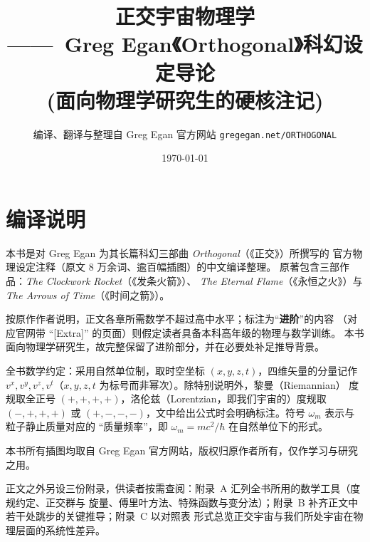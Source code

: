 



\frontmatter
\title{\Huge 正交宇宙物理学\\[6pt]
       \Large ——\ Greg Egan《Orthogonal》科幻设定导论\\(面向物理学研究生的硬核注记)}
\author{编译、翻译与整理自 Greg Egan 官方网站 \texttt{gregegan.net/ORTHOGONAL}}
\date{\today}
\maketitle

\chapter*{编译说明}
本书是对 Greg Egan 为其长篇科幻三部曲 \emph{Orthogonal}（《正交》）所撰写的
官方物理设定注释（原文 8 万余词、逾百幅插图）的中文编译整理。
原著包含三部作品：\emph{The Clockwork Rocket}（《发条火箭》）、
\emph{The Eternal Flame}（《永恒之火》）与 \emph{The Arrows of Time}（《时间之箭》）。

按原作作者说明，正文各章所需数学不超过高中水平；标注为“\textbf{进阶}”的内容
（对应官网带 ``[Extra]'' 的页面）则假定读者具备本科高年级的物理与数学训练。
本书面向物理学研究生，故完整保留了进阶部分，并在必要处补足推导背景。

全书数学约定：采用自然单位制，取时空坐标 $(x,y,z,t)$，四维矢量的分量记作
$v^x,v^y,v^z,v^t$（$x,y,z,t$ 为标号而非幂次）。除特别说明外，黎曼（Riemannian）
度规取全正号 $(+,+,+,+)$，洛伦兹（Lorentzian，即我们宇宙的）度规取 $(-,+,+,+)$
或 $(+,-,-,-)$，文中给出公式时会明确标注。符号 $\omega_m$ 表示与粒子静止质量对应的
“质量频率”，即 $\omega_m = mc^2/\hbar$ 在自然单位下的形式。

本书所有插图均取自 Greg Egan 官方网站，版权归原作者所有，仅作学习与研究之用。

正文之外另设三份附录，供读者按需查阅：附录~A 汇列全书所用的数学工具（度规约定、正交群与
旋量、傅里叶方法、特殊函数与变分法）；附录~B 补齐正文中若干处跳步的关键推导；附录~C 以对照表
形式总览正交宇宙与我们所处宇宙在物理层面的系统性差异。

\tableofcontents
\listoffigures

\mainmatter





















\appendix





